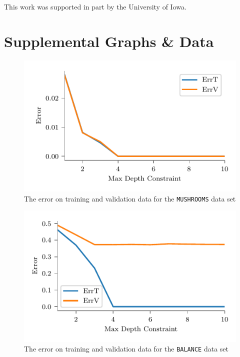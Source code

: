 \documentclass[screen, authorversion, nonacm, sigconf]{acmart}
\begin{document}
\begin{acks}
This work was supported in part by the University of Iowa.
\end{acks}




\appendix

\section{Supplemental Graphs \& Data}

\begin{figure}[h]
  \centering
  \includegraphics[width=\columnwidth]{figures/chart_errt_errv_mushrooms_ours.pdf}
  \caption{The error on training and validation data for the \texttt{MUSHROOMS} data set}
  \label{fig:mushroomserrterrv}
\end{figure}

\begin{figure}[h]
  \centering
  \includegraphics[width=\columnwidth]{figures/chart_errt_errv_balance_ours.pdf}
  \caption{The error on training and validation data for the \texttt{BALANCE} data set}
  \label{fig:mushroomserrterrv}
\end{figure}
\end{document}
